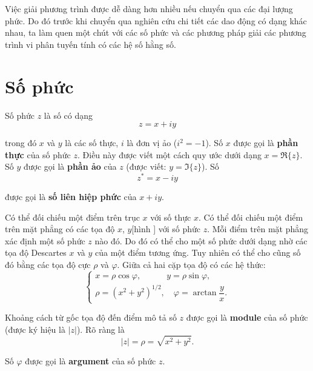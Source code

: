 Việc giải phương trình  được dễ dàng hơn nhiều nếu chuyển qua các đại lượng phức. Do đó trước khi chuyển qua nghiên cứu chi tiết các dao động có dạng khác nhau, ta làm quen một chút với các số phức và các phương pháp giải các phương trình vi phân tuyến tính có các hệ số hằng số.

\section{Số phức}\label{sec:7_3}

Số phức $z$ là số có dạng
\begin{equation}\label{eq:7_16}
	z = x + iy
\end{equation}

\noindent
trong đó $x$ và $y$ là các số thực, $i$ là đơn vị ảo ($i^2=-1$). Số $x$ được gọi là \textbf{phần thực} của số phức $z$. Điều này được viết một cách quy ước dưới dạng $x=\Re\{z\}$. Số $y$ được gọi là \textbf{phần ảo} của $z$ (được viết: $y=\Im\{z\}$). Số
\begin{equation}\label{eq:7_17}
	z^* = x - iy
\end{equation}

\noindent
được gọi là \textbf{số liên hiệp phức} của $x+iy$.

Có thể đối chiếu một điểm trên trục $x$ với số thực $x$. Có thể đối chiếu một điểm trên mặt phẳng có các tọa độ $x$, $y$[hình ] với số phức $z$. Mỗi điểm trên mặt phẳng xác định một số phức $z$ nào đó. Do đó có thể cho một số phức dưới dạng  nhờ các tọa độ Descartes $x$ và $y$ của một điểm tương ứng. Tuy nhiên có thể cho cũng số đó bằng các tọa độ cực $\rho$ và $\varphi$. Giữa cả hai cặp tọa độ có các hệ thức:
\begin{equation}\label{eq:7_18}
	\begin{cases}
		x = \rho\cos\varphi,\quad\quad\quad y = \rho\sin\varphi,\\
		\rho = \left(x^2+y^2\right)^{1/2},\quad \varphi = \arctan\dfrac{y}{x}.
	\end{cases}
\end{equation}

Khoảng cách từ gốc tọa độ đến điểm mô tả số $z$ được gọi là \textbf{module} của số phức (được ký hiệu là $|z|$). Rõ ràng là
\begin{equation}\label{eq:7_19}
	|z| = \rho = \sqrt{x^2+y^2}.
\end{equation}

\noindent
Số $\varphi$ được gọi là \textbf{argument} của số phức $z$.

